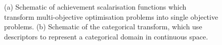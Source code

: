 \begin{figure}
    \caption{(a) Schematic of achievement scalarisation functions which transform multi-objective optimisation problems into single objective problems. (b) Schematic of the categorical transform, which use descriptors to represent a categorical domain in continuous space.}
    \label{fig:transforms}
\end{figure}

